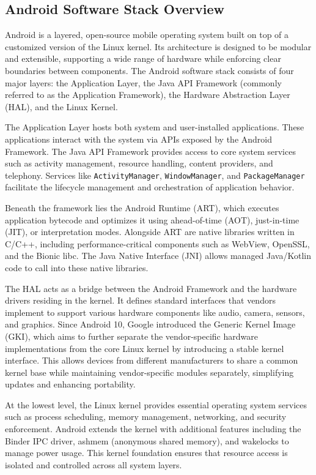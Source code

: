\documentclass[a4paper,12pt]{report}
\begin{document}
\subsection{Android Software Stack Overview}
Android is a layered, open-source mobile operating system built on top of a customized version of the
Linux kernel. Its architecture is designed to be modular and extensible, supporting a wide range of
hardware while enforcing clear boundaries between components. The Android software stack consists
of four major layers: the Application Layer, the Java API Framework (commonly referred to as the
Application Framework), the Hardware Abstraction Layer (HAL), and the Linux Kernel.

The Application Layer hosts both system and user-installed applications.
These applications interact with the system via APIs exposed by the Android Framework.
The Java API Framework provides access to core system services such as activity management,
resource handling, content providers, and telephony. Services like \texttt{ActivityManager},
\texttt{WindowManager}, and \texttt{PackageManager} facilitate the lifecycle management and
orchestration of application behavior.

Beneath the framework lies the Android Runtime (ART), which executes application bytecode and optimizes it using ahead-of-time (AOT), just-in-time (JIT), or interpretation modes. Alongside ART are native libraries written in C/C++, including performance-critical components such as WebView, OpenSSL, and the Bionic libc. The Java Native Interface (JNI) allows managed Java/Kotlin code to call into these native libraries.

The HAL acts as a bridge between the Android Framework and the hardware drivers residing in the kernel. It defines standard interfaces that vendors implement to support various hardware components like audio, camera, sensors, and graphics. Since Android 10, Google introduced the Generic Kernel Image (GKI), which aims to further separate the vendor-specific hardware implementations from the core Linux kernel by introducing a stable kernel interface. This allows devices from different manufacturers to share a common kernel base while maintaining vendor-specific modules separately, simplifying updates and enhancing portability.

At the lowest level, the Linux kernel provides essential operating system services such as process scheduling, memory management, networking, and security enforcement. Android extends the kernel with additional features including the Binder IPC driver, ashmem (anonymous shared memory), and wakelocks to manage power usage. This kernel foundation ensures that resource access is isolated and controlled across all system layers.
\end{document}
